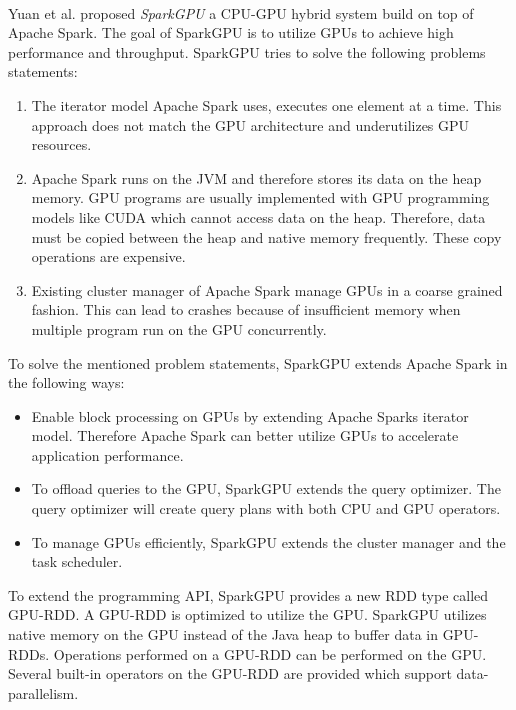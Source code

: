 \paragraph{}
Yuan et al. \cite{Yuan2016SparkGPU} proposed \textit{SparkGPU} a CPU-GPU hybrid system build on top of Apache Spark.
The goal of SparkGPU is to utilize GPUs to achieve high performance and throughput.
SparkGPU tries to solve the following problems statements:
\begin{enumerate}
\item The iterator model Apache Spark uses, executes one element at a time.
This approach does not match the GPU architecture and underutilizes GPU resources.

\item Apache Spark runs on the JVM and therefore stores its data on the heap memory.
GPU programs are usually implemented with GPU programming models like CUDA which cannot access data on the heap.
Therefore, data must be copied between the heap and native memory frequently. These copy operations are expensive.

\item Existing cluster manager of Apache Spark manage GPUs in a coarse grained fashion.
This can lead to crashes because of insufficient memory when multiple program run on the GPU concurrently.
\end{enumerate}
To solve the mentioned problem statements, SparkGPU extends Apache Spark in the following ways:
\begin{itemize}
\item Enable block processing on GPUs by extending Apache Sparks iterator model. Therefore Apache Spark can better utilize GPUs to accelerate application performance.

\item To offload queries to the GPU, SparkGPU extends the query optimizer. The query optimizer will create query plans with both CPU and GPU operators.

\item To manage GPUs efficiently, SparkGPU extends the cluster manager and the task scheduler.
\end{itemize}
To extend the programming API, SparkGPU provides a new RDD type called GPU-RDD.
A GPU-RDD is optimized to utilize the GPU.
SparkGPU utilizes native memory on the GPU instead of the Java heap to buffer data in GPU-RDDs.
Operations performed on a GPU-RDD can be performed on the GPU. Several built-in operators on the GPU-RDD are provided which support data-parallelism.


